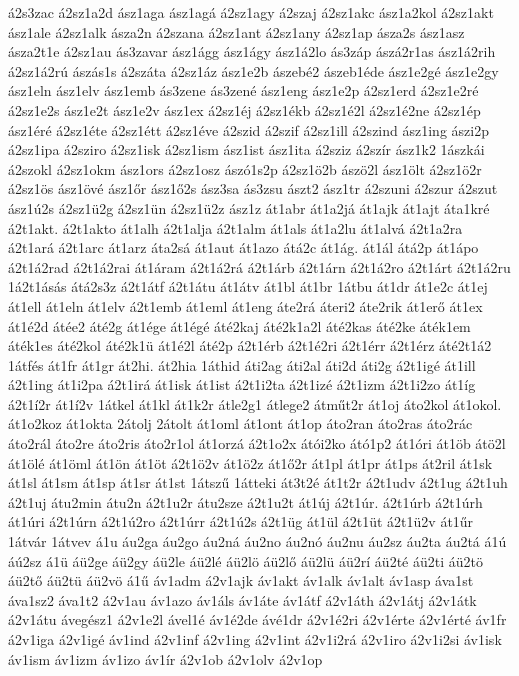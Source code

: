 {á2s3zac
á2sz1a2d
ász1aga
ász1agá
á2sz1agy
á2szaj
á2sz1akc
ász1a2kol
á2sz1akt
ász1ale
á2sz1alk
ásza2n
á2szana
á2sz1ant
á2sz1any
á2sz1ap
ásza2s
ász1asz
ásza2t1e
á2sz1au
ás3zavar
ász1ágg
ász1ágy
ász1á2lo
ás3záp
ászá2r1as
ász1á2rih
á2sz1á2rú
ászás1s
á2száta
á2sz1áz
ász1e2b
ászebé2
ászeb1éde
ász1e2gé
ász1e2gy
ász1eln
ász1elv
ász1emb
ás3zene
ás3zené
ász1eng
ász1e2p
á2sz1erd
á2sz1e2ré
á2sz1e2s
ász1e2t
ász1e2v
ász1ex
á2sz1éj
á2sz1ékb
á2sz1é2l
á2sz1é2ne
á2sz1ép
ász1éré
á2sz1éte
á2sz1étt
á2sz1éve
á2szid
á2szif
á2sz1ill
á2szind
ász1ing
ászi2p
á2sz1ipa
á2sziro
á2sz1isk
á2sz1ism
ász1ist
ász1ita
á2sziz
á2szír
ász1k2
1ászkái
á2szokl
á2sz1okm
ász1ors
á2sz1osz
ászó1s2p
á2sz1ö2b
ászö2l
ász1ölt
á2sz1ö2r
á2sz1ös
ász1övé
ász1őr
ász1ő2s
ász3sa
ás3zsu
ászt2
ász1tr
á2szuni
á2szur
á2szut
ász1ú2s
á2sz1ü2g
á2sz1ün
á2sz1ü2z
ász1z
át1abr
át1a2já
át1ajk
át1ajt
áta1kré
á2t1akt.
á2t1akto
át1alh
á2t1alja
á2t1alm
át1als
át1a2lu
át1alvá
á2t1a2ra
á2t1ará
á2t1arc
át1arz
áta2sá
át1aut
át1azo
átá2c
át1ág.
át1ál
átá2p
át1ápo
á2t1á2rad
á2t1á2rai
át1áram
á2t1á2rá
á2t1árb
á2t1árn
á2t1á2ro
á2t1árt
á2t1á2ru
1á2t1ásás
átá2s3z
á2t1átf
á2t1átu
át1átv
át1bl
át1br
1átbu
át1dr
át1e2c
át1ej
át1ell
át1eln
át1elv
á2t1emb
át1eml
át1eng
áte2rá
áteri2
áte2rik
át1erő
át1ex
át1é2d
átée2
áté2g
át1ége
át1égé
áté2kaj
áté2k1a2l
áté2kas
áté2ke
áték1em
áték1es
áté2kol
áté2k1ü
át1é2l
áté2p
á2t1érb
á2t1é2ri
á2t1érr
á2t1érz
áté2t1á2
1átfés
át1fr
át1gr
át2hi.
át2hia
1áthid
áti2ag
áti2al
áti2d
áti2g
á2t1igé
át1ill
á2t1ing
át1i2pa
á2t1irá
át1isk
át1ist
á2t1i2ta
á2t1izé
á2t1izm
á2t1i2zo
át1íg
á2t1í2r
át1í2v
1átkel
át1kl
át1k2r
átle2g1
átlege2
átműt2r
át1oj
áto2kol
át1okol.
át1o2koz
át1okta
2átolj
2átolt
át1oml
át1ont
át1op
áto2ran
áto2ras
áto2rác
áto2rál
áto2re
áto2ris
áto2r1ol
át1orzá
á2t1o2x
átói2ko
átó1p2
át1óri
át1öb
átö2l
át1ölé
át1öml
át1ön
át1öt
á2t1ö2v
át1ö2z
át1ő2r
át1pl
át1pr
át1ps
át2ril
át1sk
át1sl
át1sm
át1sp
át1sr
át1st
1átszű
1átteki
át3t2é
át1t2r
á2t1udv
á2t1ug
á2t1uh
á2t1uj
átu2min
átu2n
á2t1u2r
átu2sze
á2t1u2t
át1új
á2t1úr.
á2t1úrb
á2t1úrh
át1úri
á2t1úrn
á2t1ú2ro
á2t1úrr
á2t1ú2s
á2t1üg
át1ül
á2t1üt
á2t1ü2v
át1űr
1átvár
1átvev
á1u
áu2ga
áu2go
áu2ná
áu2no
áu2nó
áu2nu
áu2sz
áu2ta
áu2tá
á1ú
áú2sz
á1ü
áü2ge
áü2gy
áü2le
áü2lé
áü2lö
áü2lő
áü2lü
áü2rí
áü2té
áü2ti
áü2tö
áü2tő
áü2tü
áü2vö
á1ű
áv1adm
á2v1ajk
áv1akt
áv1alk
áv1alt
áv1asp
áva1st
áva1sz2
áva1t2
á2v1au
áv1azo
áv1áls
áv1áte
áv1átf
á2v1áth
á2v1átj
á2v1átk
á2v1átu
ávegész1
á2v1e2l
ável1é
áv1é2de
ávé1dr
á2v1é2ri
á2v1érte
á2v1érté
áv1fr
á2v1iga
á2v1igé
áv1ind
á2v1inf
á2v1ing
á2v1int
á2v1i2rá
á2v1iro
á2v1i2si
áv1isk
áv1ism
áv1izm
áv1izo
áv1ír
á2v1ob
á2v1olv
á2v1op
}
